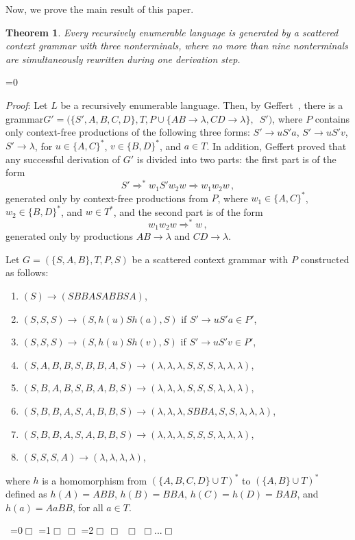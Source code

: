 \documentclass[copyright]{eptcs}
\makeatletter
\newtheorem{theorem}{Theorem}
\newcounter{d@proof}\let\thed@proof\relax\setcounter{d@proof}{0}
\newcommand*{\qed}{$\Box$}
\newenvironment{proof}{\ifnum \value{d@proof}=0{\setcounter{claim}{0}}\else\fi
  \stepcounter{d@proof}\par\noindent
  {\rmfamily\itshape\mdseries Proof\/}:\hspace{\labelsep}\ignorespaces}{\addtocounter{d@proof}{-1}\mbox{}\nolinebreak\hfill~\ifnum \value{d@proof}=0{\qed}\else
    \ifnum \value{d@proof}=1{\qed\nolinebreak\,\nolinebreak\qed}\else
      \ifnum \value{d@proof}=2{\qed\nolinebreak\,\nolinebreak\qed
          \nolinebreak\,\nolinebreak\qed}\else
        {\qed\nolinebreak...\nolinebreak\qed}\fi\fi\fi
  \medbreak
}
\newcommand{\Ra}{\Rightarrow}
\newcommand{\eps}{\lambda}
\makeatother
\begin{document}
  Now, we prove the main result of this paper.

  \begin{theorem}
    Every recursively enumerable language is generated by a scattered context grammar with three nonterminals, where no more than nine nonterminals are simultaneously rewritten during one derivation step.
  \end{theorem}
  \begin{proof}
    Let $L$ be a recursively enumerable language. Then, by Geffert~\cite{Geffert:1988}, 
    there is a grammar\linebreak \hbox{$G'=(\{S',A,B,C,D\},T,P\cup\{AB\to\eps,CD\to\eps\},$ $S')$}, 
    where $P$ contains only context-free productions of the following three forms: 
    $S'\to uS'a$, $S'\to uS'v$, $S'\to \eps$, for $u\in\{A,C\}^*$, $v\in\{B,D\}^*$, 
    and $a\in T$. In addition, Geffert proved that any successful derivation of $G'$ is 
    divided into two parts: the first part is of the form 
    \[S' \Ra^* w_1S'w_2w \Ra w_1w_2w\,,\] 
    generated only by context-free productions from $P$, where $w_1\in\{A,C\}^*$, 
    $w_2\in\{B,D\}^*$, and $w\in T^*$, and the second part is of the form 
    \[w_1w_2w\Ra^* w\,,\] 
    generated only by productions $AB\to\eps$ and $CD\to\eps$.

    Let $G=(\{S,A,B\},T,P,S)$ be a scattered context grammar with $P$ constructed as follows:
    \begin{enumerate}
      \item\label{genS} $(S) \to (SBBASABBSA)$,
      \item\label{a2} $(S,S,S) \to (S,h(u)Sh(a),S)$ \qquad if $S' \to uS'a \in P'$,
      \item\label{a3} $(S,S,S) \to (S,h(u)Sh(v),S)$ \qquad if $S' \to uS'v \in P'$,
      \item\label{a4} $(S,A,B,B,S,B,B,A,S) \to (\eps,\eps,\eps,S,S,S,\eps,\eps,\eps)$,
      \item\label{a5} $(S,B,A,B,S,B,A,B,S) \to (\eps,\eps,\eps,S,S,S,\eps,\eps,\eps)$,
      \item\label{a6} $(S,B,B,A,S,A,B,B,S) \to (\eps,\eps,\eps,SBBA,S,S,\eps,\eps,\eps)$,
      \item\label{a7} $(S,B,B,A,S,A,B,B,S) \to (\eps,\eps,\eps,S,S,S,\eps,\eps,\eps)$,
      \item\label{remS} $(S,S,S,A) \to (\eps,\eps,\eps,\eps)$,
    \end{enumerate}
    where $h$ is a homomorphism from $(\{A,B,C,D\}\cup T)^*$ to $(\{A,B\}\cup T)^*$ defined as $h(A)=ABB$, $h(B)=BBA$, $h(C)=h(D)=BAB$, and $h(a)=AaBB$, for all $a\in T$.


\end{proof}
\end{document}
